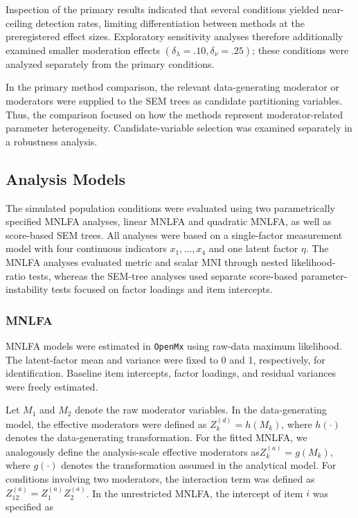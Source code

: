 \documentclass[
  man,
  floatsintext]{apa7}
\begin{document}
Inspection of the primary results indicated that several conditions
yielded near-ceiling detection rates, limiting differentiation between
methods at the preregistered effect sizes. Exploratory sensitivity
analyses therefore additionally examined smaller moderation effects
\((\delta_\lambda=.10, \delta_\nu=.25)\); these conditions were analyzed
separately from the primary conditions.

In the primary method comparison, the relevant data-generating moderator
or moderators were supplied to the SEM trees as candidate partitioning
variables. Thus, the comparison focused on how the methods represent
moderator-related parameter heterogeneity. Candidate-variable selection
was examined separately in a robustness analysis.

\subsection{Analysis Models}\label{analysis-models}

The simulated population conditions were evaluated using two
parametrically specified MNLFA analyses, linear MNLFA and quadratic
MNLFA, as well as score-based SEM trees. All analyses were based on a
single-factor measurement model with four continuous indicators
\(x_1,\ldots,x_4\) and one latent factor \(\eta\). The MNLFA analyses
evaluated metric and scalar MNI through nested likelihood-ratio tests,
whereas the SEM-tree analyses used separate score-based
parameter-instability tests focused on factor loadings and item
intercepts.

\subsubsection{MNLFA}\label{mnlfa}

MNLFA models were estimated in \texttt{OpenMx} using raw-data maximum
likelihood. The latent-factor mean and variance were fixed to 0 and 1,
respectively, for identification. Baseline item intercepts, factor
loadings, and residual variances were freely estimated.

Let \(M_1\) and \(M_2\) denote the raw moderator variables. In the
data-generating model, the effective moderators were defined as
\(Z_k^{(d)}=h(M_k)\), where \(h(\cdot)\) denotes the data-generating
transformation. For the fitted MNLFA, we analogously define the
analysis-scale effective moderators as\(Z_k^{(a)}=g(M_k)\), where
\(g(\cdot)\) denotes the transformation assumed in the analytical model.
For conditions involving two moderators, the interaction term was
defined as \(Z_{12}^{(a)}=Z_1^{(a)}Z_2^{(a)}\). In the unrestricted
MNLFA, the intercept of item \(i\) was specified as
\end{document}
